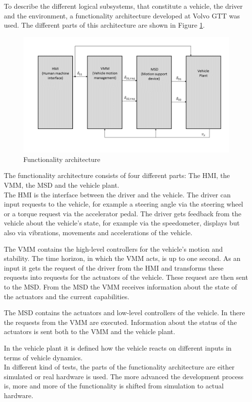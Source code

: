 \documentclass[ExampleMasters.tex]{subfiles}
\begin{document}
To describe the different logical subsystems, that constitute a vehicle, the driver and the environment, a functionality architecture developed at Volvo GTT was used. The different parts of this architecture are shown in Figure \ref{fig:funct_architecture}.

\begin{figure}[!htb]
	\centering
	\includegraphics[width=1\linewidth]{figures/functionality_architecture}
	
	\caption{Functionality architecture}
	\label{fig:funct_architecture}
\end{figure}

The functionality architecture consists of four different parts: The \gls{HMI}, the \gls{VMM}, the \gls{MSD} and the vehicle plant.\\
The \gls{HMI} is the interface between the driver and the vehicle. The driver can input requests to the vehicle, for example a steering angle via the steering wheel or a torque request via the accelerator pedal. The driver gets feedback from the vehicle about the vehicle's state, for example via the speedometer, displays but also via vibrations, movements and accelerations of the vehicle.

The \gls{VMM} contains the high-level controllers for the vehicle's motion and stability. The time horizon, in which the \gls{VMM} acts, is up to one second\cite{nilsson2015traffic}. As an input it gets the request of the driver from the \gls{HMI} and transforms these requests into requests for the actuators of the vehicle. These request are then sent to the \gls{MSD}. From the \gls{MSD} the \gls{VMM} receives information about the state of the actuators and the current capabilities.

The \gls{MSD} contains the actuators and low-level controllers of the vehicle. In there the requests from the \gls{VMM} are executed. Information about the status of the actuators is sent both to the \gls{VMM} and the vehicle plant.

In the vehicle plant it is defined how the vehicle reacts on different inputs in terms of vehicle dynamics.
\\
In different kind of tests, the parts of the functionality architecture are either simulated or real hardware is used. The more advanced the development process is, more and more of the functionality is shifted from simulation to actual hardware.
\end{document}

